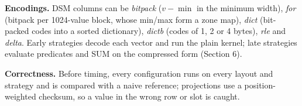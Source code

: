 \textbf{Encodings.} DSM columns can be \emph{bitpack} ($v - \min$ in the minimum width),
\emph{for} (bitpack per 1024-value block, whose min/max form a zone map), \emph{dict}
(bit-packed codes into a sorted dictionary), \emph{dictb} (codes of 1, 2 or 4 bytes), \emph{rle}
and \emph{delta}. Early strategies decode each vector and run the plain kernel; late strategies
evaluate predicates and SUM on the compressed form (Section 6).

\textbf{Correctness.} Before timing, every configuration runs on every layout and strategy and
is compared with a naive reference; projections use a position-weighted checksum, so a value in
the wrong row or slot is caught.
